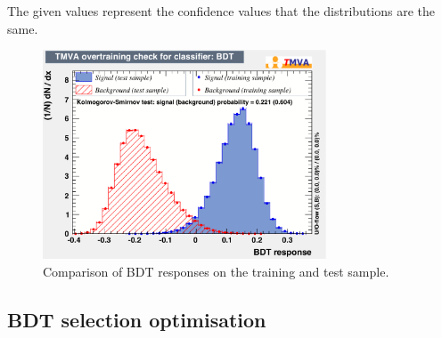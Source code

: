 The given values represent the confidence values that the distributions are the same.
\begin{figure}[tbp]
    \centering
    \includegraphics[width=0.75\textwidth]{07selection/figs/overtrain_BDT.pdf}
    \caption{Comparison of \ac{BDT} responses on the training and test sample.}
    \label{fig:BDTOVertraining}
\end{figure}

\subsection{BDT selection optimisation}
\label{sec:BDTOpt}

